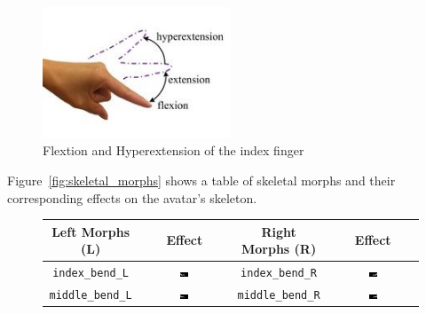 \documentclass[../../main.tex]{subfiles}
\begin{document}
{\begin{figure}
    \centering
    \includegraphics[width=0.5\textwidth]{chapters/avatar_creation_pose_synthesis/images/hyper-extension_flexion.jpg}
    \caption{Flextion and Hyperextension of the index finger}
    \label{fig:hyper-extension_flexion}
\end{figure}

Figure~\ref{fig:skeletal_morphs} shows a table of skeletal morphs and their corresponding effects on the avatar's skeleton.

\begin{figure}
    \centering
    \begin{tabular}{|c|c|c|c|}
        \hline
        \textbf{Left Morphs (L)} & \textbf{Effect} & \textbf{Right Morphs (R)} & \textbf{Effect} \\ 
        \hline
        \texttt{index\_bend\_L} & \includegraphics[width=0.1\textwidth]{chapters/avatar_creation_pose_synthesis/images/morph_renders/index_bend_L_morph.png} & 
        \texttt{index\_bend\_R} & \includegraphics[width=0.1\textwidth]{chapters/avatar_creation_pose_synthesis/images/morph_renders/index_bend_R_morph.png} \\

        \texttt{middle\_bend\_L} & \includegraphics[width=0.1\textwidth]{chapters/avatar_creation_pose_synthesis/images/morph_renders/middle_bend_L_morph.png} &
        \texttt{middle\_bend\_R} & \includegraphics[width=0.1\textwidth]{chapters/avatar_creation_pose_synthesis/images/morph_renders/middle_bend_R_morph.png} \\


\end{tabular}
\end{figure}}
\end{document}
